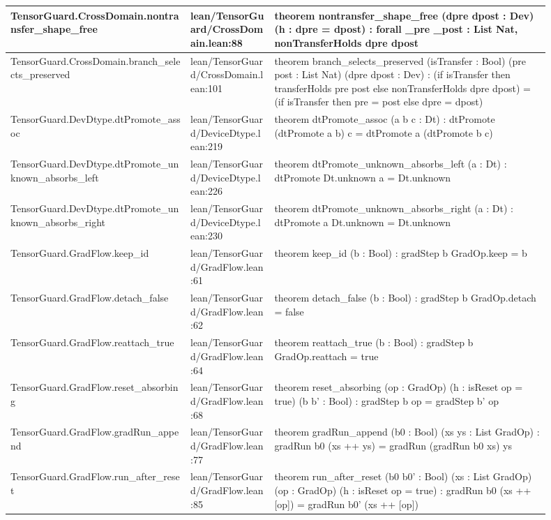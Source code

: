 \documentclass[10pt]{article}
\begin{document}
\begin{longtable}{|p{0.30\linewidth}|p{0.14\linewidth}|p{0.46\linewidth}|}
\hline
TensorGuard.CrossDomain.nontransfer\_shape\_free & lean/TensorGuard/CrossDomain.lean:88 & theorem nontransfer\_shape\_free (dpre dpost : Dev) (h : dpre = dpost) : forall \_pre \_post : List Nat, nonTransferHolds dpre dpost \\
\hline
TensorGuard.CrossDomain.branch\_selects\_preserved & lean/TensorGuard/CrossDomain.lean:101 & theorem branch\_selects\_preserved (isTransfer : Bool) (pre post : List Nat) (dpre dpost : Dev) : (if isTransfer then transferHolds pre post else nonTransferHolds dpre dpost) = (if isTransfer then pre = post else dpre = dpost) \\
\hline
TensorGuard.DevDtype.dtPromote\_assoc & lean/TensorGuard/DeviceDtype.lean:219 & theorem dtPromote\_assoc (a b c : Dt) : dtPromote (dtPromote a b) c = dtPromote a (dtPromote b c) \\
\hline
TensorGuard.DevDtype.dtPromote\_unknown\_absorbs\_left & lean/TensorGuard/DeviceDtype.lean:226 & theorem dtPromote\_unknown\_absorbs\_left (a : Dt) : dtPromote Dt.unknown a = Dt.unknown \\
\hline
TensorGuard.DevDtype.dtPromote\_unknown\_absorbs\_right & lean/TensorGuard/DeviceDtype.lean:230 & theorem dtPromote\_unknown\_absorbs\_right (a : Dt) : dtPromote a Dt.unknown = Dt.unknown \\
\hline
TensorGuard.GradFlow.keep\_id & lean/TensorGuard/GradFlow.lean:61 & theorem keep\_id (b : Bool) : gradStep b GradOp.keep = b \\
\hline
TensorGuard.GradFlow.detach\_false & lean/TensorGuard/GradFlow.lean:62 & theorem detach\_false (b : Bool) : gradStep b GradOp.detach = false \\
\hline
TensorGuard.GradFlow.reattach\_true & lean/TensorGuard/GradFlow.lean:64 & theorem reattach\_true (b : Bool) : gradStep b GradOp.reattach = true \\
\hline
TensorGuard.GradFlow.reset\_absorbing & lean/TensorGuard/GradFlow.lean:68 & theorem reset\_absorbing (op : GradOp) (h : isReset op = true) (b b' : Bool) : gradStep b op = gradStep b' op \\
\hline
TensorGuard.GradFlow.gradRun\_append & lean/TensorGuard/GradFlow.lean:77 & theorem gradRun\_append (b0 : Bool) (xs ys : List GradOp) : gradRun b0 (xs ++ ys) = gradRun (gradRun b0 xs) ys \\
\hline
TensorGuard.GradFlow.run\_after\_reset & lean/TensorGuard/GradFlow.lean:85 & theorem run\_after\_reset (b0 b0' : Bool) (xs : List GradOp) (op : GradOp) (h : isReset op = true) : gradRun b0 (xs ++ [op]) = gradRun b0' (xs ++ [op]) \\

\end{longtable}
\end{document}

